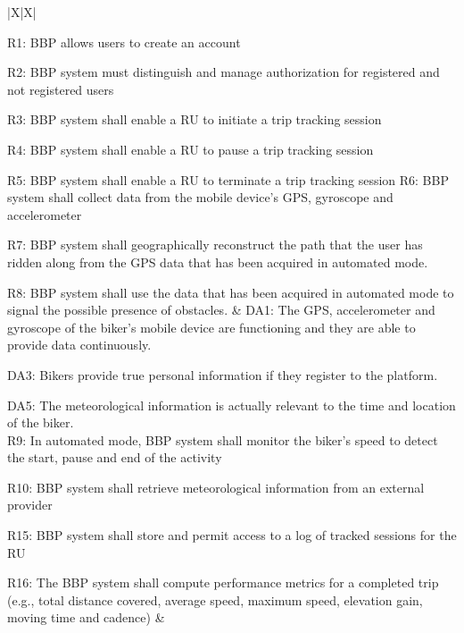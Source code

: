 \documentclass{article}
\begin{document}
\newpage
\begin{xltabular}{\textwidth}{|X|X|}
    \hline
     \\
    \hline
 
    R1: BBP allows users to create an account \par
    R2: BBP system must distinguish and manage authorization for registered and not registered users \par
    R3: BBP system shall enable a RU to initiate a trip tracking session \par
    R4: BBP system shall enable a RU to pause a trip tracking session \par
    R5: BBP system shall enable a RU to terminate a trip tracking session
    R6: BBP system shall collect data from the mobile device’s GPS, gyroscope and accelerometer \par
    R7: BBP system shall geographically reconstruct the path that the user has ridden along from the GPS data that has been acquired in automated mode. \par
    R8: BBP system shall use the data that has been acquired in automated mode to signal the possible presence of obstacles. 
    & 
    DA1: The GPS, accelerometer and gyroscope of the biker’s mobile device are functioning and they are able to provide data continuously.   \par
    DA3: Bikers provide true personal information if they register to the platform. \par
    DA5: The meteorological information is actually relevant to the time and location of the biker. \\
    R9: In automated mode, BBP system shall monitor the biker’s speed to detect the start, pause and end of the activity \par
    R10: BBP system shall retrieve meteorological information from an external provider \par
    R15: BBP system shall store and permit access to a log of tracked sessions for the RU \par
    R16: The BBP system shall compute performance metrics for a completed trip (e.g., total distance covered, average speed, maximum speed, elevation gain, moving time and cadence) & \par
    \\
    \hline

\end{xltabular}
\end{document}
